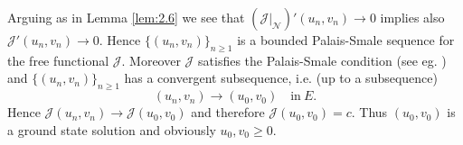 \documentclass{scrartcl}
\newtheorem{Rem}[Th]{Remark}
\newcommand{\cJ}{{\mathcal J}}
\newcommand{\cN}{{\mathcal N}}
\newcommand{\R}{\mathbb{R}}
\numberwithin{equation}{section}
\begin{document}

Arguing as in Lemma \ref{lem:2.6} we see that $\left( \cJ \Big|_\cN \right)' (u_n, v_n) \to 0$ implies also $\cJ' (u_n, v_n) \to 0$. Hence $\{(u_n, v_n)\}_{n\geq 1}$ is a bounded Palais-Smale sequence for the free functional $\cJ$. Moreover $\cJ$ satisfies the Palais-Smale condition (see eg. \cite[Lemma 2.17]{Willem}) and $\{ (u_n, v_n) \}_{n \geq 1}$ has a convergent subsequence, i.e. (up to a subsequence)
$$
(u_n, v_n) \to (u_0,v_0) \quad \mbox{in} \ E.
$$
Hence $\cJ(u_n,v_n) \to \cJ(u_0,v_0)$ and therefore $\cJ(u_0,v_0) = c$. Thus $(u_0,v_0)$ is a ground state solution and obviously $u_0,v_0 \geq 0$.
\end{document}
